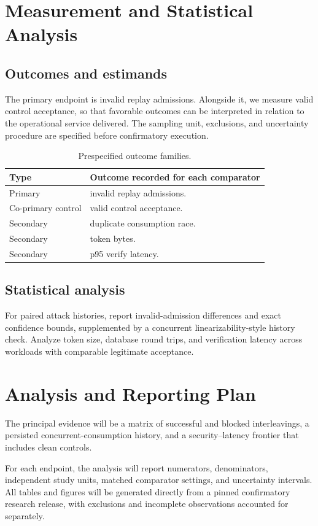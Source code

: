 \documentclass[11pt,a4paper]{article}
\begin{document}
\section{Measurement and Statistical Analysis}
\subsection{Outcomes and estimands}
The primary endpoint is invalid replay admissions. Alongside it, we measure valid control acceptance, so that favorable outcomes can be interpreted in relation to the operational service delivered. The sampling unit, exclusions, and uncertainty procedure are specified before confirmatory execution.
\begin{table}[ht]
\centering\footnotesize
\caption{Prespecified outcome families.}
\begin{tabularx}{\linewidth}{@{}lX@{}}\toprule
Type & Outcome recorded for each comparator \\ \midrule
Primary & invalid replay admissions. \\ 
Co-primary control & valid control acceptance. \\ 
Secondary & duplicate consumption race. \\ 
Secondary & token bytes. \\ 
Secondary & p95 verify latency. \\ 
\bottomrule\end{tabularx}
\end{table}

\subsection{Statistical analysis}
For paired attack histories, report invalid-admission differences and exact confidence bounds, supplemented by a concurrent linearizability-style history check. Analyze token size, database round trips, and verification latency across workloads with comparable legitimate acceptance.

\section{Analysis and Reporting Plan}
The principal evidence will be a matrix of successful and blocked interleavings, a persisted concurrent-consumption history, and a security–latency frontier that includes clean controls.

For each endpoint, the analysis will report numerators, denominators, independent study units, matched comparator settings, and uncertainty intervals. All tables and figures will be generated directly from a pinned confirmatory research release, with exclusions and incomplete observations accounted for separately.
\end{document}
